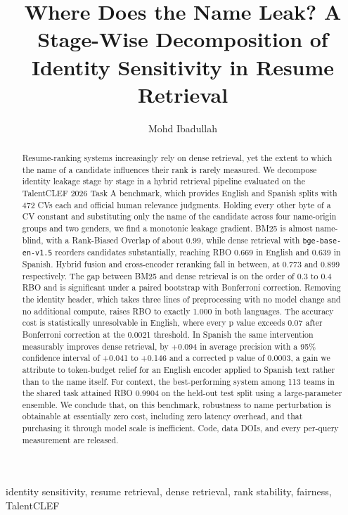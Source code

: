 \documentclass{ceurart}
\begin{document}
\title{Where Does the Name Leak? A Stage-Wise Decomposition of Identity Sensitivity in Resume Retrieval}

\author{Mohd Ibadullah}
\address{Keshav Memorial Institute of Technology, JNTUH}

\begin{abstract}
Resume-ranking systems increasingly rely on dense retrieval, yet the extent to which the
name of a candidate influences their rank is rarely measured. We decompose identity leakage
stage by stage in a hybrid retrieval pipeline evaluated on the TalentCLEF 2026 Task A
benchmark, which provides English and Spanish splits with 472 CVs each and official human
relevance judgments. Holding every other byte of a CV constant and substituting only the
name of the candidate across four name-origin groups and two genders, we find a monotonic
leakage gradient. BM25 is almost name-blind, with a Rank-Biased Overlap of about 0.99,
while dense retrieval with \texttt{bge-base-en-v1.5} reorders candidates substantially,
reaching RBO 0.669 in English and 0.639 in Spanish. Hybrid fusion and cross-encoder
reranking fall in between, at 0.773 and 0.899 respectively. The gap between BM25 and dense
retrieval is on the order of 0.3 to 0.4 RBO and is significant under a paired bootstrap
with Bonferroni correction. Removing the identity header, which takes three lines of
preprocessing with no model change and no additional compute, raises RBO to exactly 1.000
in both languages. The accuracy cost is statistically unresolvable in English, where every
p value exceeds 0.07 after Bonferroni correction at the 0.0021 threshold. In Spanish the
same intervention measurably improves dense retrieval, by +0.094 in average precision with
a 95\% confidence interval of +0.041 to +0.146 and a corrected p value of 0.0003, a gain
we attribute to token-budget relief for an English encoder applied to Spanish text rather
than to the name itself. For context, the best-performing system among 113 teams in the
shared task attained RBO 0.9904 on the held-out test split using a large-parameter
ensemble. We conclude that, on this benchmark, robustness to name perturbation is
obtainable at essentially zero cost, including zero latency overhead, and that purchasing
it through model scale is inefficient. Code, data DOIs, and every per-query measurement
are released.
\end{abstract}

\begin{keywords}
identity sensitivity, resume retrieval, dense retrieval, rank stability, fairness, TalentCLEF
\end{keywords}
\end{document}
